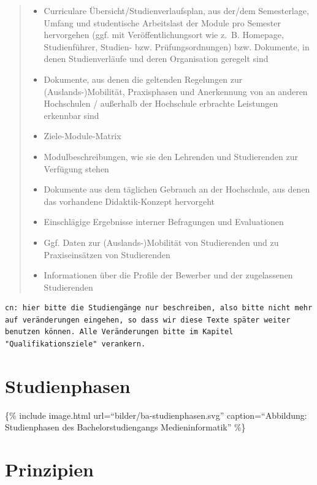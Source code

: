 \begin{quote}
\begin{itemize}
\item
  Curriculare Übersicht/Studienverlaufsplan, aus der/dem Semesterlage,
  Umfang und studentische Arbeitslast der Module pro Semester
  hervorgehen (ggf. mit Veröffentlichungsort wie z.~B. Homepage,
  Studienführer, Studien- bzw. Prüfungsordnungen) bzw. Dokumente, in
  denen Studienverläufe und deren Organisation geregelt sind
\item
  Dokumente, aus denen die geltenden Regelungen zur
  (Auslands-)Mobilität, Praxisphasen und Anerkennung von an anderen
  Hochschulen / außerhalb der Hochschule erbrachte Leistungen erkennbar
  sind
\item
  Ziele-Module-Matrix
\item
  Modulbeschreibungen, wie sie den Lehrenden und Studierenden zur
  Verfügung stehen
\item
  Dokumente aus dem täglichen Gebrauch an der Hochschule, aus denen das
  vorhandene Didaktik-Konzept hervorgeht
\item
  Einschlägige Ergebnisse interner Befragungen und Evaluationen
\item
  Ggf. Daten zur (Auslands-)Mobilität von Studierenden und zu
  Praxiseinsätzen von Studierenden
\item
  Informationen über die Profile der Bewerber und der zugelassenen
  Studierenden
\end{itemize}
\end{quote}

\begin{verbatim}
cn: hier bitte die Studiengänge nur beschreiben, also bitte nicht mehr auf veränderungen eingehen, so dass wir diese Texte später weiter benutzen können. Alle Veränderungen bitte im Kapitel "Qualifikationsziele" verankern.
\end{verbatim}

\section{Studienphasen}\label{studienphasen}

\{\% include image.html url=``bilder/ba-studienphasen.svg''
caption=``Abbildung: Studienphasen des Bachelorstudiengangs
Medieninformatik'' \%\}

\section{Prinzipien}\label{prinzipien}

